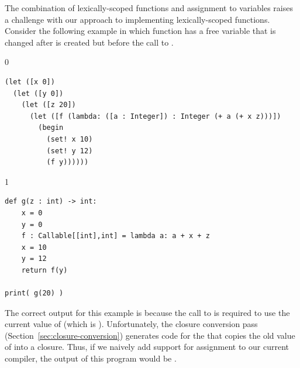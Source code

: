 \documentclass[7x10,nocrop]{TimesAPriori_MIT}%
\def\racketEd{0}
\def\pythonEd{1}
\def\edition{1}
\begin{document}
The combination of lexically-scoped functions and assignment to
variables raises a challenge with our approach to implementing
lexically-scoped functions. Consider the following example in which
function  has a free variable  that is changed after
 is created but before the call to .
{\if\edition\racketEd
\begin{lstlisting}
(let ([x 0])
  (let ([y 0])
    (let ([z 20])
      (let ([f (lambda: ([a : Integer]) : Integer (+ a (+ x z)))])
        (begin
          (set! x 10)
          (set! y 12)
          (f y))))))
\end{lstlisting}
\fi}
{\if\edition\pythonEd
\begin{lstlisting}
def g(z : int) -> int:
    x = 0
    y = 0  
    f : Callable[[int],int] = lambda a: a + x + z
    x = 10
    y = 12
    return f(y)

print( g(20) )
\end{lstlisting}
\fi}
The correct output for this example is  because the call to
 is required to use the current value of  (which is
). Unfortunately, the closure conversion pass
(Section~\ref{sec:closure-conversion}) generates code for the
 that copies the old value of  into a
closure. Thus, if we naively add support for assignment to our current
compiler, the output of this program would be .
\end{document}
